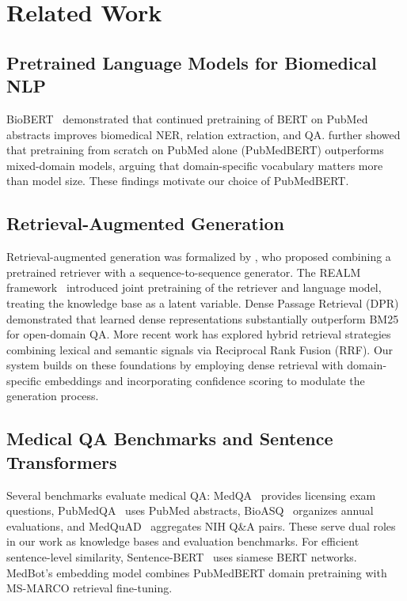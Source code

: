 \documentclass[11pt,a4paper]{article}
\begin{document}
\section{Related Work}

\subsection{Pretrained Language Models for Biomedical NLP}

BioBERT~\citep{lee2020biobert} demonstrated that continued pretraining of BERT on PubMed abstracts improves biomedical NER, relation extraction, and QA. \citet{gu2021domain} further showed that pretraining from scratch on PubMed alone (PubMedBERT) outperforms mixed-domain models, arguing that domain-specific vocabulary matters more than model size. These findings motivate our choice of PubMedBERT.

\subsection{Retrieval-Augmented Generation}

Retrieval-augmented generation was formalized by \citet{lewis2020retrieval}, who proposed combining a pretrained retriever with a sequence-to-sequence generator. The REALM framework~\citep{guu2020retrieval} introduced joint pretraining of the retriever and language model, treating the knowledge base as a latent variable. Dense Passage Retrieval (DPR)~\citep{karpukhin2020dense} demonstrated that learned dense representations substantially outperform BM25 for open-domain QA. More recent work has explored hybrid retrieval strategies combining lexical and semantic signals via Reciprocal Rank Fusion (RRF). Our system builds on these foundations by employing dense retrieval with domain-specific embeddings and incorporating confidence scoring to modulate the generation process.

\subsection{Medical QA Benchmarks and Sentence Transformers}

Several benchmarks evaluate medical QA: MedQA~\citep{jin2021disease} provides licensing exam questions, PubMedQA~\citep{jin2019pubmedqa} uses PubMed abstracts, BioASQ~\citep{treccovid2020} organizes annual evaluations, and MedQuAD~\citep{abacha2019question} aggregates NIH Q\&A pairs. These serve dual roles in our work as knowledge bases and evaluation benchmarks. For efficient sentence-level similarity, Sentence-BERT~\citep{reimers2019sentence} uses siamese BERT networks. MedBot's embedding model combines PubMedBERT domain pretraining with MS-MARCO retrieval fine-tuning.
\end{document}
